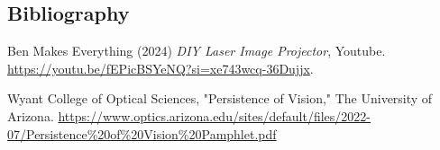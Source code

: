 \documentclass[twocolumn]{revtex4-2}
\begin{document}
\setlength{\parindent}{0cm}




\begin{thebibliography}{99}
\section*{Bibliography}


Ben Makes Everything (2024) \emph{DIY Laser Image Projector}, Youtube. \url{https://youtu.be/fEPicBSYeNQ?si=xe743wcq-36Dujjx}.

Wyant College of Optical Sciences, "Persistence of Vision," The University of Arizona. \url{https://www.optics.arizona.edu/sites/default/files/2022-07/Persistence%20of%20Vision%20Pamphlet.pdf}

\end{thebibliography}

\setlength{\parindent}{0cm}
\end{document}
